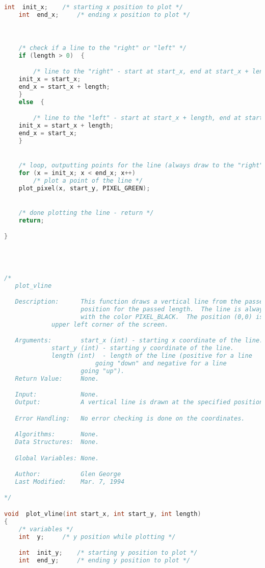 \begin{lstlisting}[language=C]
    int  init_x;	/* starting x position to plot */
    int  end_x;		/* ending x position to plot */



    /* check if a line to the "right" or "left" */
    if (length > 0)  {

        /* line to the "right" - start at start_x, end at start_x + length */
	init_x = start_x;
	end_x = start_x + length;
    }
    else  {

        /* line to the "left" - start at start_x + length, end at start_x */
	init_x = start_x + length;
	end_x = start_x;
    }


    /* loop, outputting points for the line (always draw to the "right") */
    for (x = init_x; x < end_x; x++)
        /* plot a point of the line */
	plot_pixel(x, start_y, PIXEL_GREEN);


    /* done plotting the line - return */
    return;

}




/*
   plot_vline

   Description:      This function draws a vertical line from the passed
                     position for the passed length.  The line is always drawn
                     with the color PIXEL_BLACK.  The position (0,0) is the
		     upper left corner of the screen.

   Arguments:        start_x (int) - starting x coordinate of the line.
   		     start_y (int) - starting y coordinate of the line.
		     length (int)  - length of the line (positive for a line
		     		     going "down" and negative for a line
				     going "up").
   Return Value:     None.

   Input:            None.
   Output:           A vertical line is drawn at the specified position.

   Error Handling:   No error checking is done on the coordinates.

   Algorithms:       None.
   Data Structures:  None.

   Global Variables: None.

   Author:           Glen George
   Last Modified:    Mar. 7, 1994

*/

void  plot_vline(int start_x, int start_y, int length)
{
    /* variables */
    int  y;		/* y position while plotting */

    int  init_y;	/* starting y position to plot */
    int  end_y;		/* ending y position to plot */




\end{lstlisting}
